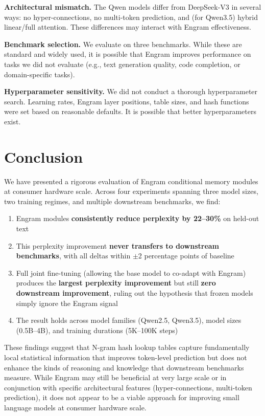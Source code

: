 \documentclass{article}
\begin{document}
\textbf{Architectural mismatch.} The Qwen models differ from DeepSeek-V3 in several ways: no hyper-connections, no multi-token prediction, and (for Qwen3.5) hybrid linear/full attention. These differences may interact with Engram effectiveness.

\textbf{Benchmark selection.} We evaluate on three benchmarks. While these are standard and widely used, it is possible that Engram improves performance on tasks we did not evaluate (e.g., text generation quality, code completion, or domain-specific tasks).

\textbf{Hyperparameter sensitivity.} We did not conduct a thorough hyperparameter search. Learning rates, Engram layer positions, table sizes, and hash functions were set based on reasonable defaults. It is possible that better hyperparameters exist.

\section{Conclusion}

We have presented a rigorous evaluation of Engram conditional memory modules at consumer hardware scale. Across four experiments spanning three model sizes, two training regimes, and multiple downstream benchmarks, we find:

\begin{enumerate}[nosep]
    \item Engram modules \textbf{consistently reduce perplexity by 22--30\%} on held-out text
    \item This perplexity improvement \textbf{never transfers to downstream benchmarks}, with all deltas within $\pm$2 percentage points of baseline
    \item Full joint fine-tuning (allowing the base model to co-adapt with Engram) produces the \textbf{largest perplexity improvement} but still \textbf{zero downstream improvement}, ruling out the hypothesis that frozen models simply ignore the Engram signal
    \item The result holds across model families (Qwen2.5, Qwen3.5), model sizes (0.5B--4B), and training durations (5K--100K steps)
\end{enumerate}

These findings suggest that N-gram hash lookup tables capture fundamentally local statistical information that improves token-level prediction but does not enhance the kinds of reasoning and knowledge that downstream benchmarks measure. While Engram may still be beneficial at very large scale or in conjunction with specific architectural features (hyper-connections, multi-token prediction), it does not appear to be a viable approach for improving small language models at consumer hardware scale.
\end{document}
